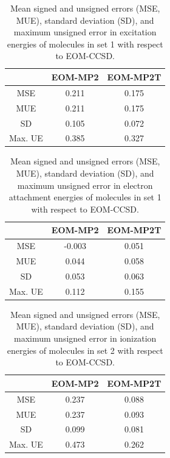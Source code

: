 \documentclass[12pt,nofootinbib]{revtex4}
\begin{document}
\begin{table}[htbp]
	\centering
	\caption{Mean signed and unsigned errors (MSE, MUE), standard deviation (SD), and maximum unsigned error in excitation energies of molecules in set 1 with respect to EOM-CCSD.}
	\begin{tabular}{ccc}
		\toprule
		& EOM-MP2 & EOM-MP2T \\
		\hline
		MSE   & 0.211 & 0.175 \\
		MUE   & 0.211 & 0.175 \\
		SD    & 0.105 & 0.072 \\
		Max. UE & 0.385 & 0.327 \\
		\hline
	\end{tabular}%
	\label{tab:set1_ee}%
\end{table}%


\begin{table}[htbp]
	\centering
	\caption{Mean signed and unsigned errors (MSE, MUE), standard deviation (SD), and maximum unsigned error in electron attachment energies of molecules in set 1 with respect to EOM-CCSD.}
	\begin{tabular}{ccc}
		\toprule
		& EOM-MP2 & EOM-MP2T \\
		\hline
		MSE   & -0.003 & 0.051 \\
		MUE   & 0.044 & 0.058 \\
		SD    & 0.053 & 0.063 \\
		Max. UE & 0.112 & 0.155 \\
		\hline
	\end{tabular}%
	\label{tab:set1_ea}%
\end{table}%


\begin{table}[htbp]
	\centering
	\caption{Mean signed and unsigned errors (MSE, MUE), standard deviation (SD), and maximum unsigned error in ionization energies of molecules in set 2 with respect to EOM-CCSD.}
	\begin{tabular}{ccc}
		\toprule
		& EOM-MP2 & EOM-MP2T \\
		\hline
		MSE   & 0.237 & 0.088 \\
		MUE   & 0.237 & 0.093 \\
		SD    & 0.099 & 0.081 \\
		Max. UE & 0.473 & 0.262 \\
		\hline
	\end{tabular}%
	\label{tab:set2_ip}%
\end{table}%
\end{document}
